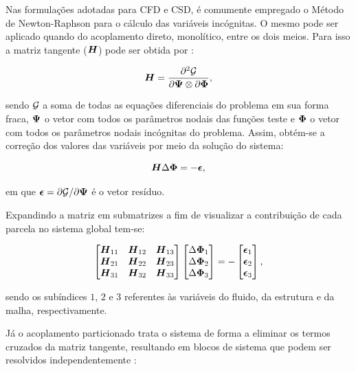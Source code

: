 Nas formulações adotadas para CFD e CSD, é comumente empregado o Método de Newton-Raphson para o cálculo das variáveis incógnitas. O mesmo pode ser aplicado quando do acoplamento direto, monolítico, entre os dois meios. Para isso a matriz tangente ($\boldsymbol{H}$) pode ser obtida por \cite{bazilevs2013computational,sanches2022metodos}:

\begin{equation}
    \boldsymbol{H}=\frac{\partial^2\mathcal{G}}{\partial\boldsymbol{\Psi}\otimes\partial\boldsymbol{\Phi}}\text{,}
\end{equation}

\noindent sendo $\mathcal{G}$ a soma de todas as equações diferenciais do problema em sua forma fraca, $\boldsymbol{\Psi}$ o vetor com todos os parâmetros nodais das funções teste e $\boldsymbol{\Phi}$ o vetor com todos os parâmetros nodais incógnitas do problema. Assim, obtém-se a correção dos valores das variáveis por meio da solução do sistema:

\begin{equation}
    \boldsymbol{H}\Delta\boldsymbol{\Phi}=-\boldsymbol{\epsilon}\text{,}
\end{equation}

\noindent em que $\boldsymbol{\epsilon}=\partial\mathcal{G}/\partial\boldsymbol{\Psi}$ é o vetor resíduo.

Expandindo a matriz em submatrizes a fim de visualizar a contribuição de cada parcela no sistema global tem-se:

\begin{equation}
    \begin{bmatrix}
        \boldsymbol{H}_{11} & \boldsymbol{H}_{12} & \boldsymbol{H}_{13} \\
        \boldsymbol{H}_{21} & \boldsymbol{H}_{22} & \boldsymbol{H}_{23} \\
        \boldsymbol{H}_{31} & \boldsymbol{H}_{32} & \boldsymbol{H}_{33}
    \end{bmatrix}\begin{bmatrix}
        \Delta\boldsymbol{\Phi}_1 \\\Delta\boldsymbol{\Phi}_2\\\Delta\boldsymbol{\Phi}_3
    \end{bmatrix}=-\begin{bmatrix}
        \boldsymbol{\epsilon}_1 \\\boldsymbol{\epsilon}_2\\\boldsymbol{\epsilon}_3
    \end{bmatrix}\text{,}
\end{equation}

\noindent sendo os subíndices $1$, $2$ e $3$ referentes às variáveis do fluido, da estrutura e da malha, respectivamente.

Já o acoplamento particionado trata o sistema de forma a eliminar os termos cruzados da matriz tangente, resultando em blocos de sistema que podem ser resolvidos independentemente \cite{bazilevs2013computational}:


